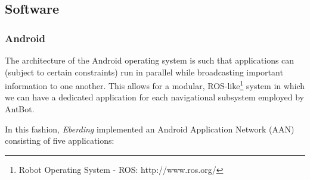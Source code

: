 \documentclass[a4paper,12pt,twoside,openright]{article}
\begin{document}
\subsection{ Software }
\subsubsection{ Android } \label{subsubsec:droid}
The architecture of the Android operating system is such that applications can (subject to certain
constraints) run in parallel while broadcasting important information to one another. This allows
for a modular, ROS-like\footnote{Robot Operating System - ROS: http://www.ros.org/}
system in which we can have a dedicated application for each navigational subsystem employed by AntBot.
\newline

In this fashion, \textit{Eberding} implemented an Android Application Network (AAN) consisting of
five applications:
\newline
\end{document}
